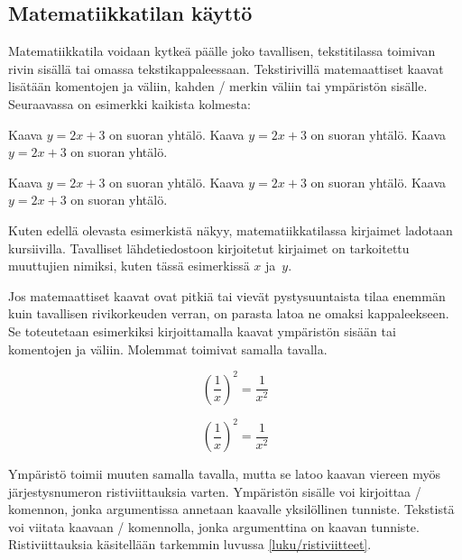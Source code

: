 \subsection{Matematiikkatilan käyttö}
\label{luku/matematiikka-käyttö}

Matematiikkatila voidaan kytkeä päälle joko tavallisen, tekstitilassa
toimivan rivin sisällä tai omassa tekstikappaleessaan. Tekstirivillä
matemaattiset kaavat lisätään komentojen \komento{(} ja \komento{)}
väliin, kahden \koodi{\$}\-/ merkin väliin tai ympäristön
 sisälle. Seuraavassa on esimerkki kaikista kolmesta:

\begin{koodilohkosis}
Kaava \( y = 2x + 3 \) on suoran yhtälö.
Kaava $y = 2x + 3$ on suoran yhtälö.
Kaava \begin{math} y = 2x + 3 \end{math} on suoran yhtälö.
\end{koodilohkosis}

\begin{tulossis}
Kaava \( y = 2x + 3 \) on suoran yhtälö.
Kaava $y = 2x + 3$ on suoran yhtälö.
Kaava \begin{math} y = 2x + 3 \end{math} on suoran yhtälö.
\end{tulossis}

\noindent
Kuten edellä olevasta esimerkistä näkyy, matematiikkatilassa kirjaimet
ladotaan kursiivilla. Tavalliset lähdetiedostoon kirjoitetut kirjaimet
on tarkoitettu muuttujien nimiksi, kuten tässä esimerkissä $x$ ja~$y$.

Jos matemaattiset kaavat ovat pitkiä tai vievät pystysuuntaista tilaa
enemmän kuin tavallisen rivikorkeuden verran, on parasta latoa ne omaksi
kappaleekseen. Se toteutetaan esimerkiksi kirjoittamalla kaavat
ympäristön  sisään tai komentojen \komento{[} ja
\komento{]} väliin. Molemmat toimivat samalla tavalla.

\komentoi{[}
\komentoi{]}
\begin{koodilohkosis}
\[ \left(\frac{1}{x}\right)^2 = \frac{1}{x^2} \]
\end{koodilohkosis}
\[ \left(\frac{1}{x}\right)^2 = \frac{1}{x^2} \]

\noindent
Ympäristö  toimii muuten samalla tavalla, mutta se
latoo kaavan viereen myös järjestysnumeron ristiviittauksia varten.
Ympäristön sisälle voi kirjoittaa \-/ komennon, jonka
argumentissa annetaan kaavalle yksilöllinen tunniste. Tekstistä voi
viitata kaavaan \-/ komennolla, jonka argumenttina on
kaavan tunniste. Ristiviittauksia käsitellään tarkemmin luvussa
\ref{luku/ristiviitteet}.

